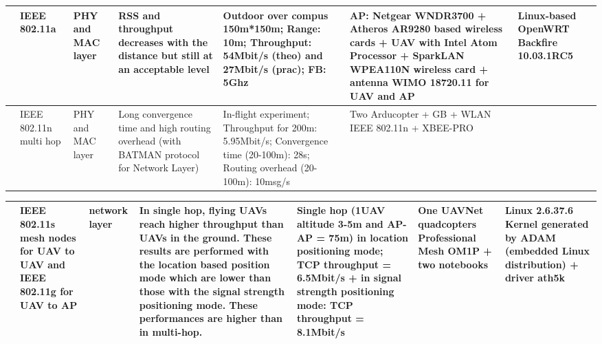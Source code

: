 \documentclass[11pt,openany]{book}
\begin{document}
\begin{algorimth}[H]
\begin{landscape}
\begin{table}[H]
\begin{tabular}{|p{1.5cm}|p{1.7cm}|p{1.3cm}|p{2.9cm}|p{2.7cm}|p{2.3cm}|p{2cm}|}
        \end{tabular}
    \end{table}
\end{landscape}
\begin{landscape}
    \begin{table}[H]
        \centering
        \begin{tabular}{|p{1.5cm}|p{1.7cm}|p{1.3cm}|p{2.9cm}|p{2.7cm}|p{2.3cm}|p{2cm}|}\hline
            [Kuschnig et al., 2012] & IEEE 802.11a           & PHY and MAC layer & RSS and throughput decreases with the distance but still at an acceptable level          & Outdoor over compus 150m*150m; Range: 10m; Throughput: 54Mbit/s (theo) and 27Mbit/s (prac); FB: 5Ghz                        & AP: Netgear WNDR3700 + Atheros AR9280 based wireless cards + UAV with Intel Atom Processor + SparkLAN WPEA110N wireless card + antenna WIMO 18720.11 for UAV and AP & Linux-based OpenWRT Backfire 10.03.1RC5 \\\hline
            [Asadpour et al., 2014] & IEEE 802.11n multi hop & PHY and MAC layer & Long convergence time and high routing overhead (with BATMAN protocol for Network Layer) & In-flight experiment; Throughput for 200m: 5.95Mbit/s; Convergence time (20-100m): 28s; Routing overhead (20-100m): 10msg/s & Two Arducopter + GB + WLAN IEEE 802.11n + XBEE-PRO                                                                                                                  &                                         \\\hline
        \end{tabular}
    \end{table}
\end{landscape}
\begin{landscape}
    \begin{table}[H]
        \centering
        \begin{tabular}{|p{1.5cm}|p{1.7cm}|p{1.3cm}|p{2.9cm}|p{2.7cm}|p{2.3cm}|p{2cm}|}\hline
            [Morgen- thaler et al., 2012] & IEEE 802.11s mesh nodes for UAV to UAV and IEEE 802.11g for UAV to AP & network layer     & In single hop, ﬂying UAVs reach higher throughput than UAVs in the ground. These results are performed with the location based position mode which are lower than those with the signal strength positioning mode. These performances are higher than in multi-hop. & Single hop (1UAV altitude 3-5m and AP-AP = 75m) in location positioning mode; TCP throughput = 6.5Mbit/s + in signal strength positioning mode: TCP throughput = 8.1Mbit/s & One UAVNet quadcopters Professional Mesh OM1P + two notebooks & Linux 2.6.37.6 Kernel generated by ADAM (embedded Linux distribution) + driver ath5k \\\hline

\end{tabular}
\end{table}
\end{landscape}
\end{algorimth}
\end{document}
